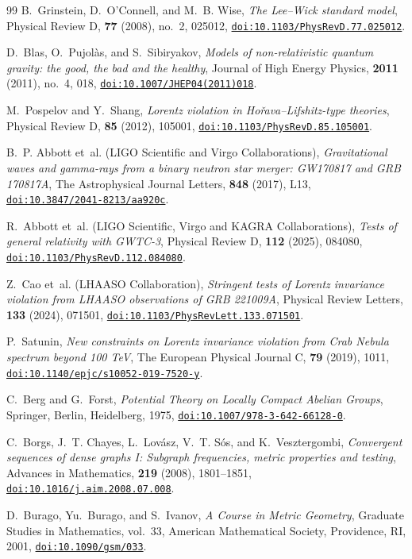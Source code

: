 \documentclass[11pt,a4paper,reqno]{amsart}
\theoremstyle{definition}
\numberwithin{equation}{section}
\providecommand{\doi}[1]{\href{https://doi.org/#1}{\nolinkurl{doi:#1}}}
\providecommand{\doi}[1]{\href{https://doi.org/#1}{\nolinkurl{doi:#1}}}
\begin{document}
\begin{thebibliography}{99}
B.~Grinstein, D.~O'Connell, and M.~B. Wise,
\emph{The Lee--Wick standard model},
Physical Review D, \textbf{77} (2008), no.~2, 025012,
\doi{10.1103/PhysRevD.77.025012}.

D.~Blas, O.~Pujol\`as, and S.~Sibiryakov,
\emph{Models of non-relativistic quantum gravity: the good, the bad and the healthy},
Journal of High Energy Physics, \textbf{2011} (2011), no.~4, 018,
\doi{10.1007/JHEP04(2011)018}.

M.~Pospelov and Y.~Shang,
\emph{Lorentz violation in Ho\v{r}ava--Lifshitz-type theories},
Physical Review D, \textbf{85} (2012), 105001,
\doi{10.1103/PhysRevD.85.105001}.

B.~P. Abbott et~al. (LIGO Scientific and Virgo Collaborations),
\emph{Gravitational waves and gamma-rays from a binary neutron star merger: GW170817 and GRB 170817A},
The Astrophysical Journal Letters, \textbf{848} (2017), L13,
\doi{10.3847/2041-8213/aa920c}.

R.~Abbott et~al. (LIGO Scientific, Virgo and KAGRA Collaborations),
\emph{Tests of general relativity with GWTC-3},
Physical Review D, \textbf{112} (2025), 084080,
\doi{10.1103/PhysRevD.112.084080}.

Z.~Cao et~al. (LHAASO Collaboration),
\emph{Stringent tests of Lorentz invariance violation from LHAASO observations of GRB 221009A},
Physical Review Letters, \textbf{133} (2024), 071501,
\doi{10.1103/PhysRevLett.133.071501}.

P.~Satunin,
\emph{New constraints on Lorentz invariance violation from Crab Nebula spectrum beyond 100 TeV},
The European Physical Journal C, \textbf{79} (2019), 1011,
\doi{10.1140/epjc/s10052-019-7520-y}.

C.~Berg and G.~Forst,
\emph{Potential Theory on Locally Compact Abelian Groups},
Springer, Berlin, Heidelberg, 1975,
\doi{10.1007/978-3-642-66128-0}.

C.~Borgs, J.~T. Chayes, L.~Lov\'asz, V.~T. S\'os, and K.~Vesztergombi,
\emph{Convergent sequences of dense graphs I: Subgraph frequencies, metric properties and testing},
Advances in Mathematics, \textbf{219} (2008), 1801--1851,
\doi{10.1016/j.aim.2008.07.008}.

D.~Burago, Yu.~Burago, and S.~Ivanov,
\emph{A Course in Metric Geometry},
Graduate Studies in Mathematics, vol.~33, American Mathematical Society, Providence, RI, 2001,
\doi{10.1090/gsm/033}.


\end{thebibliography}
\end{document}
